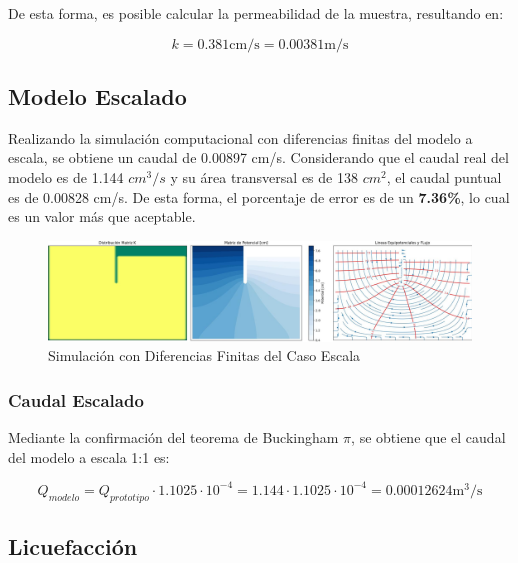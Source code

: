 De esta forma, es posible calcular la permeabilidad de la muestra, resultando en:

\begin{equation}
    k = 0.381 \text{cm/s} = 0.00381 \text{m/s}
\end{equation}

\subsection{Modelo Escalado}

Realizando la simulación computacional con diferencias finitas del modelo a escala, se obtiene un caudal de 0.00897 cm/s. Considerando que el caudal real del modelo es de 1.144 $cm^3/s$ y su área transversal es de 138 $cm^2$, el caudal puntual es de 0.00828 cm/s. De esta forma, el porcentaje de error es de un \textbf{7.36\%}, lo cual es un valor más que aceptable.

\begin{figure}[H]
    \centering
    \includegraphics[width=1\textwidth]{GRAFICOS/laplace_escala_cm.jpg}
    \caption{Simulación con Diferencias Finitas del Caso Escala}
    \label{fig:maqueta_caso_1}
\end{figure}

\subsubsection{Caudal Escalado}

Mediante la confirmación del teorema de Buckingham $\pi$, se obtiene que el caudal del modelo a escala 1:1 es:

\begin{equation}
    Q_{modelo} = Q_{prototipo} \cdot 1.1025 \cdot 10^{-4} = 1.144 \cdot 1.1025 \cdot 10^{-4} = 0.00012624 \text{m}^3/\text{s}
\end{equation}


\newpage
\subsection{Licuefacción}

